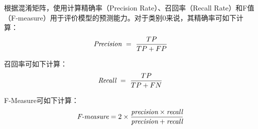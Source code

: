 根据混淆矩阵，使用计算精确率（Precision Rate）、召回率（Recall Rate）和F值（F-measure）用于评价模型的预测能力。对于类别$0$来说，其精确率可如下计算：
\begin{equation} 
\mbox{\it Precision}~=~{\frac {TP}{TP+FP}}
 \end{equation}
 
召回率可如下计算：
\begin{equation} 
\mbox{\it Recall}~=~{\frac {TP}{TP+FN}}
 \end{equation}

F-Measure可如下计算：
\begin{equation} 
\mbox{\it F-measure} =2 \times {\frac {\mbox{\it precision} \times \mbox{\it recall} }{ \mbox{\it precision} + \mbox{\it recall} } }
 \end{equation}

